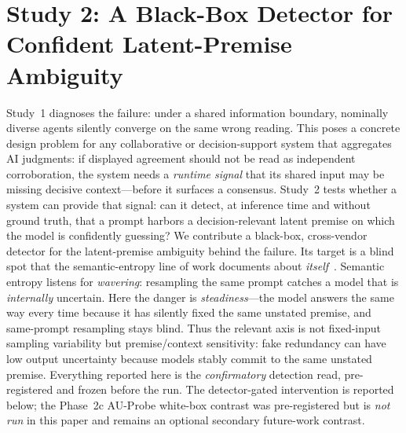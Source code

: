 \documentclass[acmsmall,screen,nonacm]{acmart}
\begin{document}
\section{Study 2: A Black-Box Detector for Confident Latent-Premise Ambiguity}
\label{sec:study2}
Study~1 diagnoses the failure: under a shared information boundary, nominally diverse agents silently
converge on the same wrong reading. This poses a concrete design problem for any collaborative or
decision-support system that aggregates AI judgments: if displayed agreement should not be read as
independent corroboration, the system needs a \emph{runtime signal} that its shared input may be missing
decisive context---before it surfaces a consensus. Study~2 tests whether a system can provide that signal:
can it detect, at inference time and without ground truth, that a prompt harbors a decision-relevant latent
premise on which the model is confidently guessing? We contribute a black-box,
cross-vendor detector for the latent-premise ambiguity behind the failure. Its target is a blind spot that the semantic-entropy line
of work documents about \emph{itself}~\cite{farquhar2024semantic}. Semantic entropy listens for
\emph{wavering}: resampling the same prompt catches a model that is \emph{internally} uncertain. Here the
danger is \emph{steadiness}---the model answers the same way every time because it has silently fixed the same
unstated premise, and same-prompt resampling stays blind. Thus the relevant axis is not
fixed-input sampling variability but premise/context sensitivity: fake redundancy can have low output
uncertainty because models stably commit to the same unstated premise. Everything reported here is the
\emph{confirmatory} detection read, pre-registered and frozen before the run. The detector-gated intervention
is reported below; the Phase~2c AU-Probe white-box contrast was pre-registered but is \emph{not run} in this
paper and remains an optional secondary future-work contrast.
\end{document}
